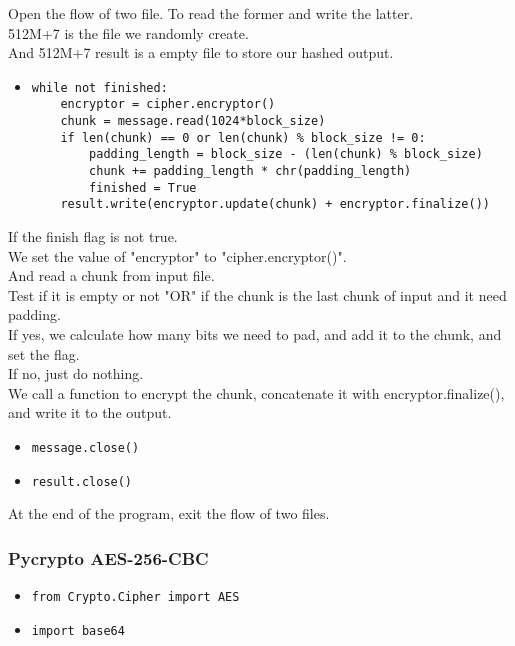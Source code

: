 \documentclass{article}
\begin{document}
\noindent Open the flow of two file. To read the former and write the latter.\\
512M+7 is the file we randomly create.\\
And 512M+7 result is a empty file to store our hashed output.

\begin{itemize}
\item \begin{verbatim}while not finished:
    encryptor = cipher.encryptor()
    chunk = message.read(1024*block_size)
    if len(chunk) == 0 or len(chunk) % block_size != 0:
        padding_length = block_size - (len(chunk) % block_size)
        chunk += padding_length * chr(padding_length)
        finished = True
    result.write(encryptor.update(chunk) + encryptor.finalize())
\end{verbatim}
\end{itemize}

\noindent If the finish flag is not true.\\
We set the value of "encryptor" to "cipher.encryptor()".\\
And read a chunk from input file.\\
Test if it is empty or not "OR" if the chunk is the last chunk of input and it need padding.\\
If yes, we calculate how many bits we need to pad, and add it to the chunk, and set the flag.\\
If no, just do nothing.\\
We call a function to encrypt the chunk, concatenate it with encryptor.finalize(), and write it to the output.

\begin{itemize}
\item \verb|message.close()|
\item \verb|result.close()|
\end{itemize}

\noindent At the end of the program, exit the flow of two files.\\

\subsubsection{Pycrypto AES-256-CBC}

\begin{itemize}
\item \verb|from Crypto.Cipher import AES|
\item \verb|import base64|
\end{itemize}
\end{document}
